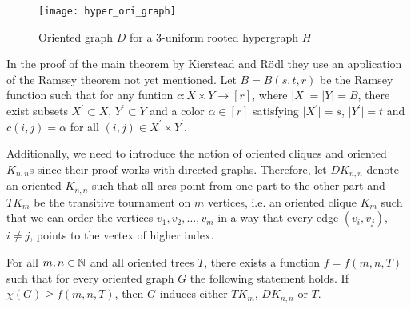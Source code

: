 \begin{figure}[ht]
\begin{center}
\texttt{[image: hyper\_ori\_graph]}
\end{center}
\caption{Oriented graph $D$ for a $3$-uniform rooted hypergraph $H$}
\label{f3cr}
\end{figure}

In the proof of the main theorem by Kierstead and Rödl they use an application of the Ramsey theorem not yet mentioned. Let $B=B(s,t,r)$ be the Ramsey function such that for any funtion $c:X\times Y\to [r]$, where $\vert X\vert =\vert Y\vert = B$, there exist subsets $X^\prime\subset X$, $Y^\prime\subset Y$ and a color $\alpha\in [r]$ satisfying $\vert X^\prime\vert = s$, $\vert Y^\prime\vert =t$ and $c(i,j) =\alpha$ for all $(i,j)\in X^\prime\times Y^\prime$. 

Additionally, we need to introduce the notion of oriented cliques and oriented $K_{n,n}$s since their proof works with directed graphs. Therefore, let $DK_{n,n}$ denote an oriented $K_{n,n}$ such that all arcs point from one part to the other part and $TK_m$ be the transitive tournament on $m$ vertices, i.e. an oriented clique $K_m$ such that we can order the vertices $v_1, v_2, \dots ,v_m$ in a way that every edge $(v_i,v_j)$, $i\neq j$, points to the vertex of higher index.

\begin{thm}\label{t2cr}
For all $m,n\in\mathbb{N}$ and all oriented trees $T$, there exists a function $f=f(m,n,T)$ such that for every oriented graph $G$ the following statement holds. If $\chi (G)\geq f(m,n,T)$, then $G$ induces either $TK_m$, $DK_{n,n}$ or $T$.
\end{thm}

